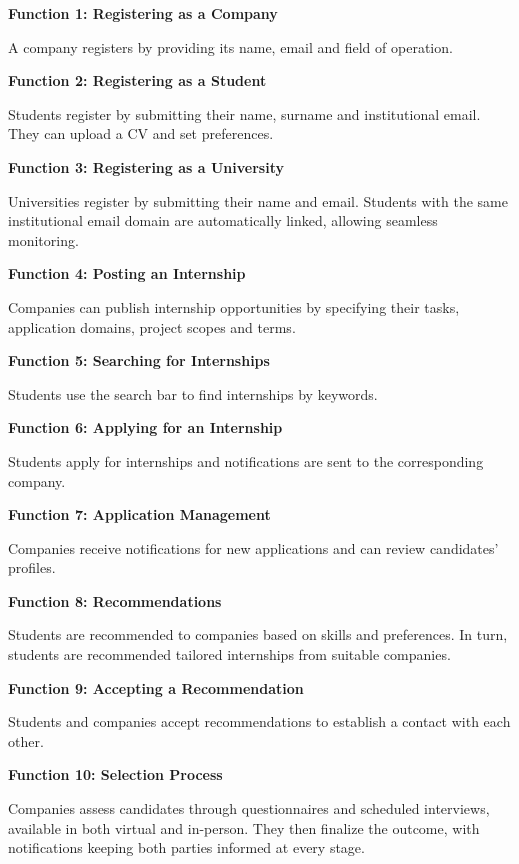 \textbf{\textcolor{polimiblue}{Function 1: Registering as a Company}}

A company registers by providing its name, email and field of operation.

\textbf{\textcolor{polimiblue}{Function 2: Registering as a Student}}

Students register by submitting their name, surname and institutional email.
They can upload a CV and set preferences.

\textbf{\textcolor{polimiblue}{Function 3: Registering as a University}}

Universities register by submitting their name and email.
Students with the same institutional email domain are automatically linked, allowing seamless monitoring.

\textbf{\textcolor{polimiblue}{Function 4: Posting an Internship}}

Companies can publish internship opportunities by specifying their tasks, application domains, project scopes and terms.

\textbf{\textcolor{polimiblue}{Function 5: Searching for Internships}}

Students use the search bar to find internships by keywords.

\textbf{\textcolor{polimiblue}{Function 6: Applying for an Internship}}

Students apply for internships and notifications are sent to the corresponding company.

\textbf{\textcolor{polimiblue}{Function 7: Application Management}}

Companies receive notifications for new applications and can review candidates’ profiles.

\textbf{\textcolor{polimiblue}{Function 8: Recommendations}}

Students are recommended to companies based on skills and preferences.
In turn, students are recommended tailored internships from suitable companies.

\textbf{\textcolor{polimiblue}{Function 9: Accepting a Recommendation}}

Students and companies accept recommendations to establish a contact with each other.

\textbf{\textcolor{polimiblue}{Function 10: Selection Process}}

Companies assess candidates through questionnaires and scheduled interviews, available in both virtual and in-person.
They then finalize the outcome, with notifications keeping both parties informed at every stage.


